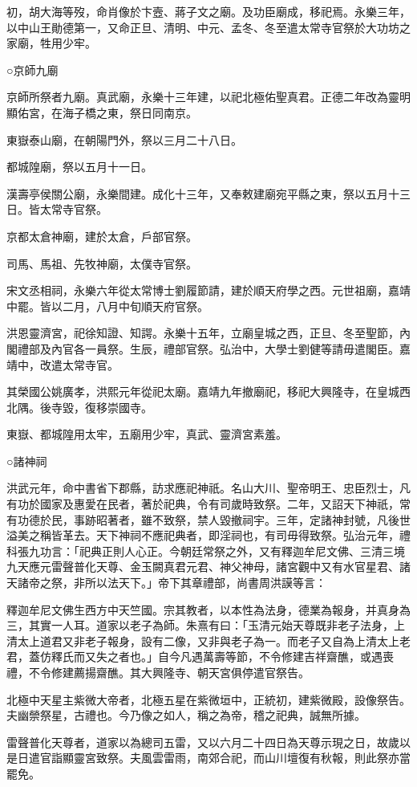 初，胡大海等歿，命肖像於卞壼、蔣子文之廟。及功臣廟成，移祀焉。永樂三年，以中山王勛德第一，又命正旦、清明、中元、孟冬、冬至遣太常寺官祭於大功坊之家廟，牲用少牢。

○京師九廟

京師所祭者九廟。真武廟，永樂十三年建，以祀北極佑聖真君。正德二年改為靈明顯佑宮，在海子橋之東，祭日同南京。

東嶽泰山廟，在朝陽門外，祭以三月二十八日。

都城隍廟，祭以五月十一日。

漢壽亭侯關公廟，永樂間建。成化十三年，又奉敕建廟宛平縣之東，祭以五月十三日。皆太常寺官祭。

京都太倉神廟，建於太倉，戶部官祭。

司馬、馬祖、先牧神廟，太僕寺官祭。

宋文丞相祠，永樂六年從太常博士劉履節請，建於順天府學之西。元世祖廟，嘉靖中罷。皆以二月，八月中旬順天府官祭。

洪恩靈濟宮，祀徐知證、知諤。永樂十五年，立廟皇城之西，正旦、冬至聖節，內閣禮部及內官各一員祭。生辰，禮部官祭。弘治中，大學士劉健等請毋遣閣臣。嘉靖中，改遣太常寺官。

其榮國公姚廣孝，洪熙元年從祀太廟。嘉靖九年撤廟祀，移祀大興隆寺，在皇城西北隅。後寺毀，復移崇國寺。

東嶽、都城隍用太牢，五廟用少牢，真武、靈濟宮素羞。

○諸神祠

洪武元年，命中書省下郡縣，訪求應祀神祇。名山大川、聖帝明王、忠臣烈士，凡有功於國家及惠愛在民者，著於祀典，令有司歲時致祭。二年，又詔天下神祇，常有功德於民，事跡昭著者，雖不致祭，禁人毀撤祠宇。三年，定諸神封號，凡後世溢美之稱皆革去。天下神祠不應祀典者，即淫祠也，有司毋得致祭。弘治元年，禮科張九功言：「祀典正則人心正。今朝廷常祭之外，又有釋迦牟尼文佛、三清三境九天應元雷聲普化天尊、金玉闕真君元君、神父神母，諸宮觀中又有水官星君、諸天諸帝之祭，非所以法天下。」帝下其章禮部，尚書周洪謨等言：

釋迦牟尼文佛生西方中天竺國。宗其教者，以本性為法身，德業為報身，并真身為三，其實一人耳。道家以老子為師。朱熹有曰：「玉清元始天尊既非老子法身，上清太上道君又非老子報身，設有二像，又非與老子為一。而老子又自為上清太上老君，蓋仿釋氏而又失之者也。」自今凡遇萬壽等節，不令修建吉祥齋醮，或遇喪禮，不令修建薦揚齋醮。其大興隆寺、朝天宮俱停遣官祭告。

北極中天星主紫微大帝者，北極五星在紫微垣中，正統初，建紫微殿，設像祭告。夫幽禜祭星，古禮也。今乃像之如人，稱之為帝，稽之祀典，誠無所據。

雷聲普化天尊者，道家以為總司五雷，又以六月二十四日為天尊示現之日，故歲以是日遣官詣顯靈宮致祭。夫風雲雷雨，南郊合祀，而山川壇復有秋報，則此祭亦當罷免。

